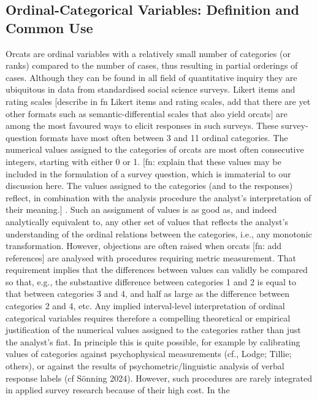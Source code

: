 \documentclass[
  12pt,
]{article}
\theoremstyle{plain}
\theoremstyle{definition}
\theoremstyle{remark}
\begin{document}
\subsection{Ordinal-Categorical Variables: Definition and Common
Use}\label{ordinal-categorical-variables-definition-and-common-use}

Orcats are ordinal variables with a relatively small number of
categories (or ranks) compared to the number of cases, thus resulting in
partial orderings of cases. Although they can be found in all field of
quantitative inquiry they are ubiquitous in data from standardised
social science surveys. Likert items and rating scales {[}describe in fn
Likert items and rating scales, add that there are yet other formats
such as semantic-differential scales that also yield orcats{]} are among
the most favoured ways to elicit responses in such surveys. These
survey-question formats have most often between 3 and 11 ordinal
categories. The numerical values assigned to the categories of orcats
are most often consecutive integers, starting with either 0 or 1. {[}fn:
explain that these values may be included in the formulation of a survey
question, which is immaterial to our discussion here. The values
assigned to the categories (and to the responses) reflect, in
combination with the analysis procedure the analyst's interpretation of
their meaning.{]} . Such an assignment of values is as good as, and
indeed analytically equivalent to, any other set of values that reflects
the analyst's understanding of the ordinal relations between the
categories, i.e., any monotonic transformation. However, objections are
often raised when orcats {[}fn: add references{]} are analysed with
procedures requiring metric measurement. That requirement implies that
the differences between values can validly be compared so that, e.g.,
the substantive difference between categories 1 and 2 is equal to that
between categories 3 and 4, and half as large as the difference between
categories 2 and 4, etc. Any implied interval-level interpretation of
ordinal categorical variables requires therefore a compelling
theoretical or empirical justification of the numerical values assigned
to the categories rather than just the analyst's fiat. In principle this
is quite possible, for example by calibrating values of categories
against psychophysical measurements (cf., Lodge; Tillie; others), or
against the results of psychometric/linguistic analysis of verbal
response labels (cf Sönning 2024). However, such procedures are rarely
integrated in applied survey research because of their high cost. In the
\end{document}
